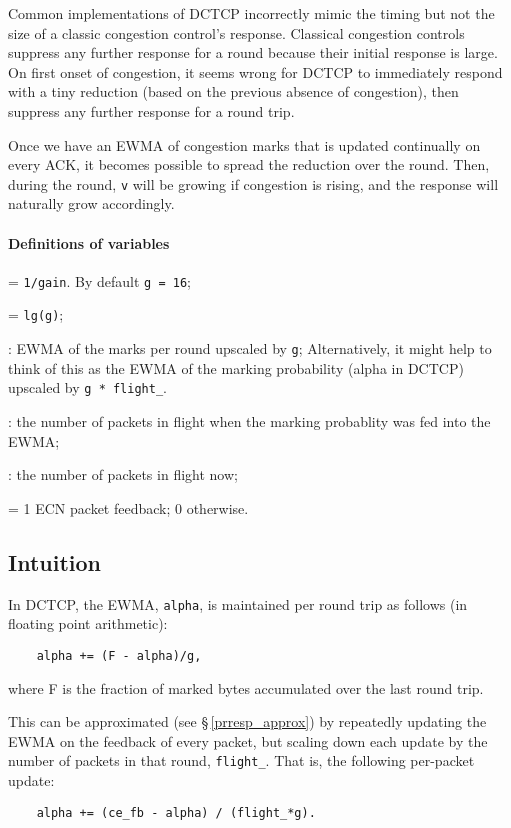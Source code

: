 Common implementations of DCTCP incorrectly mimic the timing but not the size of a classic congestion control's response. Classical congestion controls suppress any further response for a round because their initial response is large. On first onset of congestion, it seems wrong for DCTCP to immediately respond with a tiny reduction (based on the previous absence of congestion), then suppress any further response for a round trip. 

Once we have an EWMA of congestion marks that is updated continually on every ACK, it becomes possible to spread the reduction over the round. Then, during the round, \texttt{v} will be growing if congestion is rising, and the response will naturally grow accordingly.

\paragraph{Definitions of variables}
\begin{description}[nosep]
	\item [\texttt{g}] = \texttt{1/gain}. By default \texttt{g = 16};
	\item [\texttt{g\_shift}] = \texttt{lg(g)};
	\item [\texttt{av\_up}]: EWMA of the marks per round upscaled by \texttt{g}; Alternatively, it might help to think of this as the EWMA of the marking probability (alpha in DCTCP) upscaled by \texttt{g * flight\_}. 
	\item [\texttt{flight\_}]: the number of packets in flight when the marking probablity was fed into the EWMA;
	\item [\texttt{flight}]: the number of packets in flight now;
	\item [\texttt{ce\_fb}] = 1 ECN packet feedback; 0 otherwise.
\end{description}

\subsection{Intuition}\label{prresp_intuition}

In DCTCP, the EWMA, \texttt{alpha}, is maintained per round trip as follows (in floating point arithmetic):
\begin{verbatim}
    alpha += (F - alpha)/g,
\end{verbatim}
where F is the fraction of marked bytes accumulated over the last round trip.

This can be approximated (see \S\,\ref{prresp_approx}) by repeatedly updating the EWMA on the feedback of every packet, but scaling down each update by the number of packets in that round, \texttt{flight\_}. That is, the following per-packet update:
\begin{verbatim}
    alpha += (ce_fb - alpha) / (flight_*g).
\end{verbatim}

